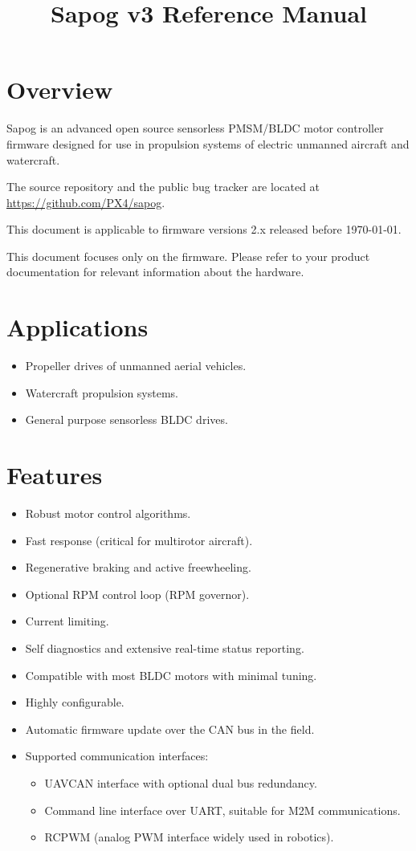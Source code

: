 \documentclass{zubaxdoc}
\title{Sapog v3 Reference Manual}
\begin{document}
	\frontmatter
	
	\begin{titlepage}
		\section*{Overview}\label{sec:overview}
		
		Sapog is an advanced open source sensorless PMSM/\allowbreak{}BLDC motor controller firmware designed for
		use in propulsion systems of electric unmanned aircraft and watercraft.
		
		The source repository and the public bug tracker are located at
		\url{https://github.com/PX4/sapog}.
		
		This document is applicable to firmware versions 2.x released before \today.
		
		This document focuses only on the firmware.
		Please refer to your product documentation for relevant information about the hardware.
		
		\section*{Applications}
		\begin{itemize}
			\item Propeller drives of unmanned aerial vehicles.
			\item Watercraft propulsion systems.
			\item General purpose sensorless BLDC drives.
		\end{itemize}
		
		\BeginRightColumn
		\section*{Features}
		\begin{itemize}
			\item Robust motor control algorithms.
			\item Fast response (critical for multirotor aircraft).
			\item Regenerative braking and active freewheeling.
			\item Optional RPM control loop (RPM governor).
			\item Current limiting.
			\item Self diagnostics and extensive real-time status reporting.
			\item Compatible with most BLDC motors with minimal tuning.
			\item Highly configurable.
			\item Automatic firmware update over the CAN bus in the field.
			\item Supported communication interfaces:
			\begin{itemize}
				\item UAVCAN interface with optional dual bus redundancy.
				\item Command line interface over UART, suitable for M2M communications.
				\item RCPWM (analog PWM interface widely used in robotics).
			\end{itemize}
		\end{itemize}
		

\end{titlepage}
\end{document}
